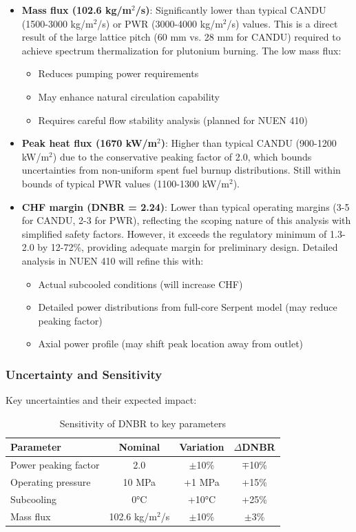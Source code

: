 \begin{itemize}
    \item \textbf{Mass flux (102.6 kg/m$^2$/s)}: Significantly lower than typical CANDU (1500-3000 kg/m$^2$/s) or PWR (3000-4000 kg/m$^2$/s) values. This is a direct result of the large lattice pitch (60 mm vs. 28 mm for CANDU) required to achieve spectrum thermalization for plutonium burning. The low mass flux:
    \begin{itemize}
        \item Reduces pumping power requirements
        \item May enhance natural circulation capability
        \item Requires careful flow stability analysis (planned for NUEN 410)
    \end{itemize}
    
    \item \textbf{Peak heat flux (1670 kW/m$^2$)}: Higher than typical CANDU (900-1200 kW/m$^2$) due to the conservative peaking factor of 2.0, which bounds uncertainties from non-uniform spent fuel burnup distributions. Still within bounds of typical PWR values (1100-1300 kW/m$^2$).
    
    \item \textbf{CHF margin (DNBR = 2.24)}: Lower than typical operating margins (3-5 for CANDU, 2-3 for PWR), reflecting the scoping nature of this analysis with simplified safety factors. However, it exceeds the regulatory minimum of 1.3-2.0 by 12-72\%, providing adequate margin for preliminary design. Detailed analysis in NUEN 410 will refine this with:
    \begin{itemize}
        \item Actual subcooled conditions (will increase CHF)
        \item Detailed power distributions from full-core Serpent model (may reduce peaking factor)
        \item Axial power profile (may shift peak location away from outlet)
    \end{itemize}
\end{itemize}

\subsubsection{Uncertainty and Sensitivity}

Key uncertainties and their expected impact:

\begin{table}[H]
\centering
\caption{Sensitivity of DNBR to key parameters}
\begin{tabular}{lccc}
\toprule
\textbf{Parameter} & \textbf{Nominal} & \textbf{Variation} & \textbf{$\Delta$DNBR} \\
\midrule
Power peaking factor & 2.0 & $\pm$10\% & $\mp$10\% \\
Operating pressure & 10 MPa & +1 MPa & +15\% \\
Subcooling & 0°C & +10°C & +25\% \\
Mass flux & 102.6 kg/m$^2$/s & $\pm$10\% & $\pm$3\% \\
\bottomrule
\end{tabular}
\end{table}


